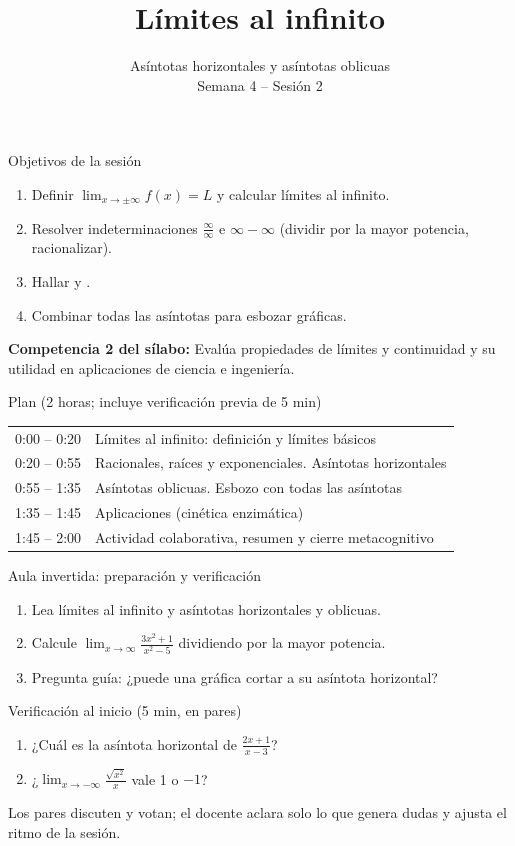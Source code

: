 \documentclass[10pt,aspectratio=169]{beamer}
\title[Asíntotas horizontales y oblicuas]{Límites al infinito}
\subtitle{Asíntotas horizontales y asíntotas oblicuas\\[2pt]\small Semana 4 -- Sesión 2}
\begin{document}
\begin{frame}
  \titlepage
\end{frame}

\begin{frame}{Objetivos de la sesión}
  \begin{enumerate}
    \item Definir $\lim_{x\to\pm\infty}f(x)=L$ y calcular límites al infinito.
    \item Resolver indeterminaciones $\frac\infty\infty$ e $\infty-\infty$ (dividir por la mayor potencia, racionalizar).
    \item Hallar  y .
    \item Combinar todas las asíntotas para esbozar gráficas.
  \end{enumerate}
  \vspace{1mm}
  {\small\textbf{Competencia 2 del sílabo:} Evalúa propiedades de límites y continuidad y su utilidad en aplicaciones de ciencia e ingeniería.}
  \begin{block}{Plan (2 horas; incluye verificación previa de 5 min)}
    \begin{tabular}{ll}
      0:00 -- 0:20 & Límites al infinito: definición y límites básicos\\
      0:20 -- 0:55 & Racionales, raíces y exponenciales. Asíntotas horizontales\\
      0:55 -- 1:35 & Asíntotas oblicuas. Esbozo con todas las asíntotas\\
      1:35 -- 1:45 & Aplicaciones (cinética enzimática)\\
      1:45 -- 2:00 & Actividad colaborativa, resumen y cierre metacognitivo
    \end{tabular}
  \end{block}
\end{frame}

\begin{frame}{Aula invertida: preparación y verificación}
  \small
  \begin{previa}
    \begin{enumerate}
      \item Lea límites al infinito y asíntotas horizontales y oblicuas.
      \item Calcule $\lim_{x\to\infty}\frac{3x^2+1}{x^2-5}$ dividiendo por la mayor potencia.
      \item Pregunta guía: ¿puede una gráfica cortar a su asíntota horizontal?
    \end{enumerate}
  \end{previa}
  \begin{block}{Verificación al inicio (5 min, en pares)}
    \begin{enumerate}
      \item ¿Cuál es la asíntota horizontal de $\frac{2x+1}{x-3}$?
      \item ¿$\lim_{x\to-\infty}\frac{\sqrt{x^2}}{x}$ vale 1 o $-1$?
    \end{enumerate}
    Los pares discuten y votan; el docente aclara solo lo que genera dudas y ajusta el ritmo de la sesión.
  \end{block}
\end{frame}
\end{document}
